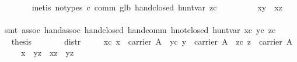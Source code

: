\begin{isabellebody}
\ \ \ \ \ \ \isamarkupfalse%
\ {}metis\ {}no{}types{}\ c{}\ comm\ glb{}\ hand{}closed\ hunt{}var\ zc{}\isanewline
\ \ \ \ \isamarkupfalse%
\ \isamarkupfalse%
\ {}{}{}{}\ {}\ x{}y\ {}\ x{}z{}\isanewline
\ \ \ \ \ \ \isamarkupfalse%
\ {}smt\ assoc\ hand{}assoc\ hand{}closed\ hand{}comm\ hnot{}closed\ hunt{}var\ xc\ yc\ zc{}\isanewline
\ \ \ \ \isamarkupfalse%
\ \isamarkupfalse%
\ {}thesis\ \isamarkupfalse%
\isanewline
\ \ \isamarkupfalse%
%
\endisatagproof
{\isafoldproof}%
%
\isadelimproof
\isanewline
%
\endisadelimproof
\isanewline
\ \ \isamarkupfalse%
\ distr{}\isanewline
\ \ \ \ \ xc{}\ {}x\ {}\ carrier\ A{}\ \ yc{}\ {}y\ {}\ carrier\ A{}\ \ zc{}\ {}z\ {}\ carrier\ A{}\isanewline
\ \ \ \ \ {}{}x\ {}\ y{}{}z\ {}\ x{}z\ {}\ y{}z{}\isanewline

\end{isabellebody}
